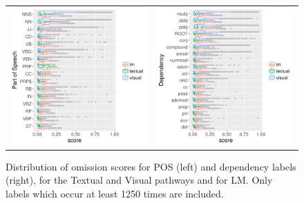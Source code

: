 \label{subsec:omission-text-vis}
\begin{figure}[!htbp]
\centering
\hspace*{-0.3in}
\setlength{\tabcolsep}{0pt}
\begin{tabular}{cc}
  \includegraphics[scale=0.5]{chapters/COLI/imaginet-omission-pos-boxplot.png}
	&
  \includegraphics[scale=0.5]{chapters/COLI/imaginet-omission-dep-boxplot.png}
  \end{tabular}

\caption{Distribution of omission scores for POS (left) and dependency labels
  (right), for the {\sc Textual} and {\sc Visual} pathways and for
  {\sc LM}. Only labels which occur at least 1250 times are included.}
\label{fig:omission-imaginet}
\end{figure}

